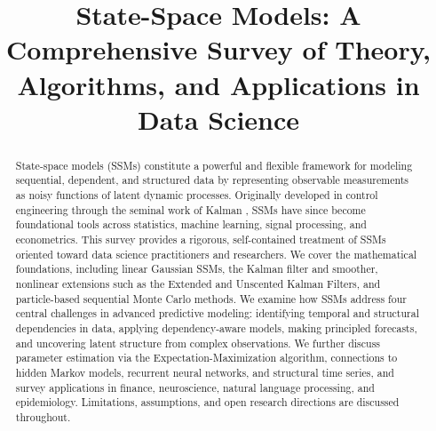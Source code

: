 \documentclass[conference]{IEEEtran}
\begin{document}
\title{State-Space Models: A Comprehensive Survey of Theory, Algorithms, and Applications in Data Science}

\author{
\and
{}
}

\maketitle

\begin{abstract}
State-space models (SSMs) constitute a powerful and flexible framework for modeling sequential, dependent, and structured data by representing observable measurements as noisy functions of latent dynamic processes. Originally developed in control engineering through the seminal work of Kalman \cite{kalman1960new}, SSMs have since become foundational tools across statistics, machine learning, signal processing, and econometrics. This survey provides a rigorous, self-contained treatment of SSMs oriented toward data science practitioners and researchers. We cover the mathematical foundations, including linear Gaussian SSMs, the Kalman filter and smoother, nonlinear extensions such as the Extended and Unscented Kalman Filters, and particle-based sequential Monte Carlo methods. We examine how SSMs address four central challenges in advanced predictive modeling: identifying temporal and structural dependencies in data, applying dependency-aware models, making principled forecasts, and uncovering latent structure from complex observations. We further discuss parameter estimation via the Expectation-Maximization algorithm, connections to hidden Markov models, recurrent neural networks, and structural time series, and survey applications in finance, neuroscience, natural language processing, and epidemiology. Limitations, assumptions, and open research directions are discussed throughout.
\end{abstract}
\end{document}
